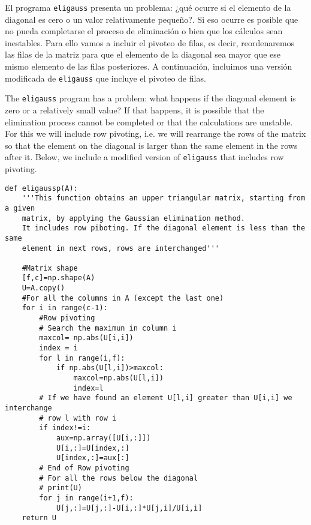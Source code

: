 \begin{paracol}{2}

El programa \texttt{eligauss} presenta un problema: ¿qué ocurre si el elemento de la diagonal es cero o un valor relativamente pequeño?. Si eso ocurre es posible que no pueda completarse el proceso de eliminación o bien que los cálculos sean inestables. Para ello vamos a  incluir el pivoteo de filas, es decir, reordenaremos las filas de la matriz para que el elemento de la diagonal sea mayor que ese mismo elemento de las filas posteriores. A continuación, incluimos una versión modificada de \texttt{eligauss} que incluye el pivoteo de filas.

\switchcolumn
The \texttt{eligauss} program has a problem: what happens if the diagonal element is zero or a relatively small value? If that happens, it is possible that the elimination process cannot be completed or that the calculations are unstable. For this we will include row pivoting, i.e. we will rearrange the rows of the matrix so that the element on the diagonal is larger than the same element in the rows after it. Below, we include a modified version of \texttt{eligauss} that includes row pivoting.
\end{paracol}

\begin{verbatim}
def eligaussp(A):
    '''This function obtains an upper triangular matrix, starting from a given
    matrix, by applying the Gaussian elimination method.
    It includes row piboting. If the diagonal element is less than the same
    element in next rows, rows are interchanged'''
   
    #Matrix shape
    [f,c]=np.shape(A)
    U=A.copy()
    #For all the columns in A (except the last one)
    for i in range(c-1):
        #Row pivoting
        # Search the maximun in column i
        maxcol= np.abs(U[i,i])
        index = i
        for l in range(i,f):
            if np.abs(U[l,i])>maxcol:
                maxcol=np.abs(U[l,i])
                index=l
        # If we have found an element U[l,i] greater than U[i,i] we interchange
        # row l with row i
        if index!=i:
            aux=np.array([U[i,:]])
            U[i,:]=U[index,:]
            U[index,:]=aux[:]
        # End of Row pivoting
        # For all the rows below the diagonal
        # print(U)
        for j in range(i+1,f):
            U[j,:]=U[j,:]-U[i,:]*U[j,i]/U[i,i]
    return U
    
\end{verbatim}

